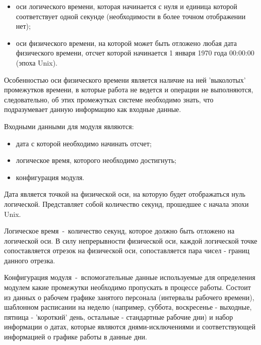 \begin{itemize}
	\item оси логического времени, которая начинается с нуля и единица которой соответствует одной секунде (необходимости в более точном отображении нет);
	\item оси физического времени, на которой может быть отложено любая дата физического времени, отсчет которой начинается 1 января 1970 года 00:00:00 (эпоха Unix).
\end{itemize}

Особенностью оси физического времени является наличие на ней 'выколотых' промежутков времени, в которые работа не ведется и операции не выполняются, следовательно, об этих промежутках системе необходимо знать, что подразумевает данную информацию как входные данные.

\indent Входными данными для модуля являются:

\begin{itemize}
	\item дата с которой необходимо начинать отсчет;
	\item логическое время, которого необходимо достигнуть;
	\item конфигурация модуля.
\end{itemize}

\indent Дата является точкой на физической оси, на которую будет отображаться нуль логической. Представляет собой количество секунд, прошедшее с начала эпохи Unix.

\indent Логическое время~-~количество секунд, которое должно быть отложено на логической оси. В силу непрерывности физической оси, каждой логической точке сопоставляется отрезок на физической оси, сопоставляется пара чисел - границ данного отрезка.

\indent Конфигурация модуля~-~вспомогательные данные используемые для определения модулем какие промежутки необходимо пропускать в процессе работы.
Состоит из данных о рабочем графике занятого персонала (интервалы рабочего времени), шаблонном расписании на неделю (например, суббота, воскресенье - выходные, пятница - 'короткий' день, остальные - стандартные рабочие дни) и набор информации о датах, которые являются днями-исключениями и соответствующей информацией о графике работы в данные дни.

